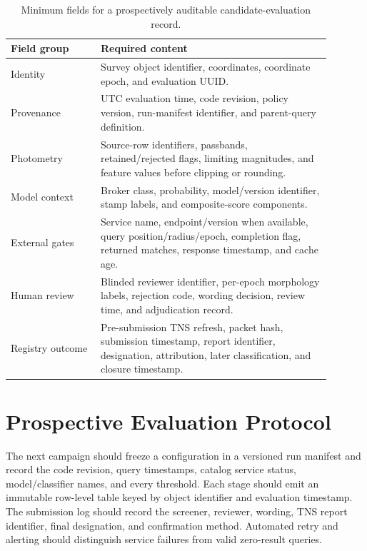\documentclass[11pt]{article}
\begin{document}
\begin{table}[ht]
\centering
\small
\caption{Minimum fields for a prospectively auditable candidate-evaluation record.}
\label{tab:schema}
\begin{tabular}{p{0.25\linewidth}p{0.64\linewidth}}
\toprule
Field group & Required content \\
\midrule
Identity & Survey object identifier, coordinates, coordinate epoch, and evaluation UUID. \\
Provenance & UTC evaluation time, code revision, policy version, run-manifest identifier, and parent-query definition. \\
Photometry & Source-row identifiers, passbands, retained/rejected flags, limiting magnitudes, and feature values before clipping or rounding. \\
Model context & Broker class, probability, model/version identifier, stamp labels, and composite-score components. \\
External gates & Service name, endpoint/version when available, query position/radius/epoch, completion flag, returned matches, response timestamp, and cache age. \\
Human review & Blinded reviewer identifier, per-epoch morphology labels, rejection code, wording decision, review time, and adjudication record. \\
Registry outcome & Pre-submission TNS refresh, packet hash, submission timestamp, report identifier, designation, attribution, later classification, and closure timestamp. \\
\bottomrule
\end{tabular}
\end{table}

\clearpage

\section{Prospective Evaluation Protocol}
\label{sec:validation-protocol}

The next campaign should freeze a configuration in a versioned run manifest and record the code revision, query timestamps, catalog service status, model/classifier names, and every threshold. Each stage should emit an immutable row-level table keyed by object identifier and evaluation timestamp. The submission log should record the screener, reviewer, wording, TNS report identifier, final designation, and confirmation method. Automated retry and alerting should distinguish service failures from valid zero-result queries.
\end{document}
